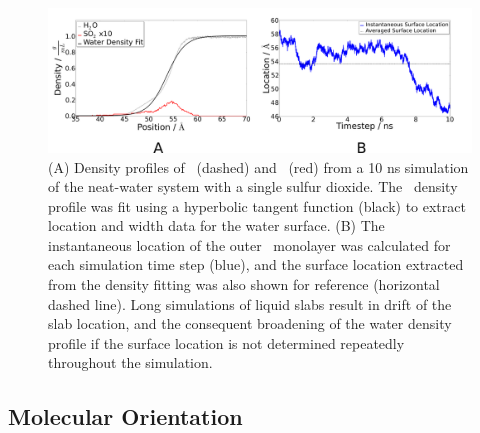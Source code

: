 \begin{figure}[h!]
	\begin{center}
		\includegraphics[scale=1.0]{images/density/density-location.png}
		\caption{(A) Density profiles of \wat~(dashed) and \suldiox~(red) from a 10 ns simulation of the neat-water system with a single sulfur dioxide. The \wat~density profile was fit using a hyperbolic tangent function (black) to extract location and width data for the water surface. (B) The instantaneous location of the outer \wat~monolayer was calculated for each simulation time step (blue), and the surface location extracted from the density fitting was also shown for reference (horizontal dashed line). Long simulations of liquid slabs result in drift of the slab location, and the consequent broadening of the water density profile if the surface location is not determined repeatedly throughout the simulation.}
		\label{fig:density-flaw}
	\end{center}
\end{figure}




\subsection{Molecular Orientation}

